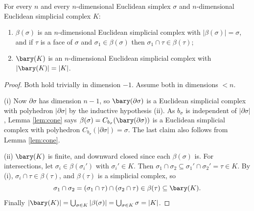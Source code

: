 \begin{theorem} \label{thm:subdivision}
	For every $n$ and every $n$-dimensional Euclidean simplex $\sigma$ and $n$-dimensional Euclidean simplicial complex $K$:
	\begin{enumerate}
		\item $\beta(\sigma)$ is an $n$-dimensional Euclidean simplicial complex with $|\beta(\sigma)| = \sigma$, and if $\tau$ is a face of $\sigma$ and $\sigma_1 \in \beta(\sigma)$ then $\sigma_1 \cap \tau \in \beta(\tau)$;
		\item $\bary(K)$ is an $n$-dimensional Euclidean simplicial complex with $|\bary(K)| = |K|$.
	\end{enumerate}
\end{theorem}
\begin{proof}
	Both hold trivially in dimension $-1$. Assume both in dimensions $< n$.

	(i) Now $\partial\sigma$ has dimension $n-1$, so $\bary(\partial\sigma)$ is a Euclidean simplicial complex with polyhedron $|\partial\sigma|$ by the inductive hypothesis (ii). As $b_\sigma$ is independent of $|\partial\sigma|$, Lemma \ref{lem:cone} says $\beta(\sigma) = C_{b_\sigma}(\bary(\partial\sigma))$ is a Euclidean simplicial complex with polyhedron $C_{b_\sigma}(|\partial\sigma|) = \sigma$. The last claim also follows from Lemma \ref{lem:cone}.

	(ii) $\bary(K)$ is finite, and downward closed since each $\beta(\sigma)$ is. For intersections, let $\sigma_i \in \beta(\sigma_i')$ with $\sigma_i' \in K$. Then $\sigma_1 \cap \sigma_2 \subseteq \sigma_1' \cap \sigma_2' = \tau \in K$. By (i), $\sigma_i \cap \tau \in \beta(\tau)$, and $\beta(\tau)$ is a simplicial complex, so
	$$
	\sigma_1\cap\sigma_2 = (\sigma_1\cap\tau)\cap(\sigma_2\cap\tau) \in \beta(\tau) \subseteq \bary(K).
	$$
	Finally $|\bary(K)| = \bigcup_{\sigma\in K}|\beta(\sigma)| = \bigcup_{\sigma\in K}\sigma = |K|$.
\end{proof}

